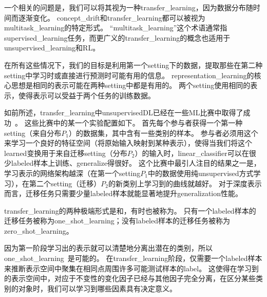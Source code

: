 
一个相关的问题是，我们可以将其视为一种\gls{transfer_learning}，因为数据分布随时间而逐渐变化。
\gls{concept_drift}和\gls{transfer_learning}都可以被视为\gls{multitask_learning}的特定形式。
``\gls{multitask_learning}''这个术语通常指\gls{supervised_learning}任务，而更广义的\gls{transfer_learning}的概念也适用于\gls{unsupervised_learning}和\gls{RL}。


在所有这些情况下，我们的目标是利用第一个\gls{setting}下的数据，提取那些在第二种\gls{setting}中学习时或直接进行预测时可能有用的信息。
\gls{representation_learning}的核心思想是相同的表示可能在两种\gls{setting}中都是有用的。
两个\gls{setting}使用相同的表示，使得表示可以受益于两个任务的训练数据。


如前所述，\gls{transfer_learning}中\gls{unsupervised}\gls{DL}已经在一些\gls{ML}比赛中取得了成功~\citep{UTLC+LISA-2011-small,goodfellow+all-NIPS2011}。
这些比赛中的某一个实验配置如下。
首先每个参与者获得一个第一种\gls{setting}（来自分布$P_1$）的数据集，其中含有一些类别的样本。
参与者必须用这个来学习一个良好的特征空间（将原始输入映射到某种表示），使得当我们将这个\gls{learned}变换用于来自迁移\gls{setting}（分布$P_2$）的输入时，\gls{linear_classifier}可以在很少\gls{labeled}样本上训练、\gls{generalize}得很好。
这个比赛中最引人注目的结果之一是，学习表示的网络架构越深（在第一个\gls{setting}$P_1$中的数据使用纯\gls{unsupervised}方式学习），在第二个\gls{setting}（迁移）$P_2$的新类别上学习到的曲线就越好。
对于深度表示而言，迁移任务只需要少量\gls{labeled}样本就能显著地提升\gls{generalization}性能。


\gls{transfer_learning}的两种极端形式是和，有时也被称为。
只有一个\gls{labeled}样本的迁移任务被称为\gls{one_shot_learning}；没有\gls{labeled}样本的迁移任务被称为\gls{zero_shot_learning}。


因为第一阶段学习出的表示就可以清楚地分离出潜在的类别，所以\gls{one_shot_learning}~\citep{Fei-Fei+al-2006}是可能的。
在\gls{transfer_learning}阶段，仅需要一个\gls{labeled}样本来推断表示空间中聚集在相同点周围许多可能测试样本的\gls{label}。
这使得在学习到的表示空间中，对应于不变性的变化因子已经与其他因子完全分离，在区分某些类别的对象时，我们可以学习到哪些因素具有决定意义。


